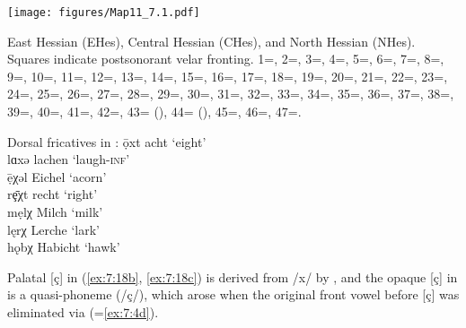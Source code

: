 \begin{map}
\centering\texttt{[image: figures/Map11\_7.1.pdf]}
\caption[East Hessian, Central Hessian, and North Hessian]{East Hessian (EHes), Central Hessian (CHes), and North Hessian (NHes). Squares indicate postsonorant velar fronting. 1=\citet{Hertel1888}, 2=\citet{Salzmann1888}, 3=\citet{Glöckner1913}, 4=\citet{Noack1938}, 5=\citet{Martin1957}, 6=\citet{Müller1958a}, 7=\citet{Weber1959}, 8=\citet{Krafft1969}, 9=\citet{Wegera1977}, 10=\citet{Post1985}, 11=\citet{Schwarz1992}, 12=\citet{Dingeldein1995}, 13=\citet{Leidolf1891}, 14=\citet{WagnerHorn1900}, 15=\citet{Knauss1906}, 16=\citet{Schaefer1907}, 17=\citet{Reuss1907}, 18=\citet{Freund1910}, 19=\citet{Faber1912}, 20=\citet{Kroh1915}, 21=\citet{Rauh1921}, 22=\citet{Schwing1921}, 23=\citet{Siemon1922}, 24=\citet{Urff1926}, 25=\citet{Schudt1927}, 26=\citet{Bender1938}, 27=\citet{Friebertshäuser1961}, 28=\citet{Schnellbacher1963}, 29=\citet{Spenter1964}, 30=\citet{BethgeBonnin1969}, 31=\citet{Schudt1970}, 32=\citet{Hasselbach1971}, 33=\citet{Hasselberg1979}, 34=\citet{Féry2017}, 35=\citet{Dittmar1891}, 36=\citet{Schoof1913a, Schoof1913b, Schoof1913c}, 37=\citet{Hackler1914}, 38=\citet{Heidt1922}, 39=\citet{Hofmann1926}, 40=\citet{Bromm1936}, 41=\citet{Corell1936}, 42=\citet{Hofmann1940}, 43=\citet{Martin1942} (), 44=\citet{Martin1942} (), 45=\citet{Müller1958b}, 46=\citet{Möhn1962}, 47=\citet{Arend1991}.}\label{map:11}
\end{map}


\ea%
\label{ex:7:18}Dorsal fricatives in :
\ea\label{ex:7:18a} ọ̄xt \tab [oːxt] \tab acht \tab ‘eight’ \\
lɑxə \tab [lɑxə] \tab lachen \tab ‘laugh\textsc{{}-inf}’ \\
\ex\label{ex:7:18b}  ẹ̄χəl \tab [eːçəl] \tab Eichel \tab ‘acorn’ \\
rȩ̄χt \tab [rɛːçt] \tab recht \tab ‘right’ \\
\ex\label{ex:7:18c} mẹlχ \tab [melç] \tab Milch \tab ‘milk’ \\
lęrχ \tab [lɛrç] \tab Lerche \tab ‘lark’ \\
\ex\label{ex:7:18d} hǫbχ \tab [hɔpç] \tab Habicht \tab ‘hawk’ \\
\z
\z 

Palatal [ç] in (\ref{ex:7:18b}, \ref{ex:7:18c}) is derived from /x/ by , and the opaque [ç] in  is a quasi-phoneme (/ç/), which arose when the original front vowel before [ç] was eliminated via  (=\ref{ex:7:4d}).

